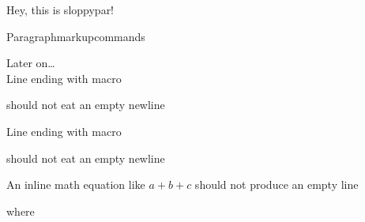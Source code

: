 \documentclass[draft]{book}
\begin{document}
\begin{sloppypar}
Hey, this is sloppypar!
\end{sloppypar}

Paragraph\linebreak[3]markup\linebreak{}commands

Later on\ldots\\

Line ending with macro\macro

should not eat an empty newline

Line ending with macro\macro{}

should not eat an empty newline

An inline math equation like $a +
b +
c$ should not produce an empty line



where\addtocounter{equation}{1}\setcounter{equation}{50}

\cleardoublepage
{}
{}
\printindex
\end{document}
